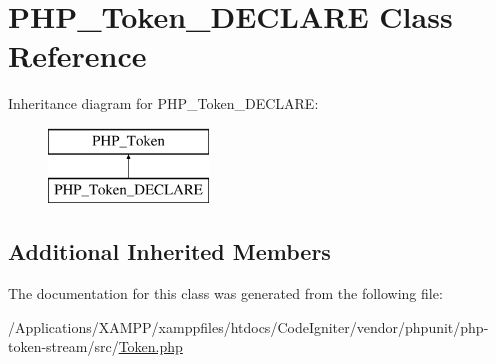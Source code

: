 \hypertarget{class_p_h_p___token___d_e_c_l_a_r_e}{}\section{P\+H\+P\+\_\+\+Token\+\_\+\+D\+E\+C\+L\+A\+RE Class Reference}
\label{class_p_h_p___token___d_e_c_l_a_r_e}
Inheritance diagram for P\+H\+P\+\_\+\+Token\+\_\+\+D\+E\+C\+L\+A\+RE\+:\begin{figure}[H]
\begin{center}
\leavevmode
\includegraphics[height=2.000000cm]{class_p_h_p___token___d_e_c_l_a_r_e}
\end{center}
\end{figure}
\subsection*{Additional Inherited Members}


The documentation for this class was generated from the following file\+:\begin{DoxyCompactItemize}
\item 
/\+Applications/\+X\+A\+M\+P\+P/xamppfiles/htdocs/\+Code\+Igniter/vendor/phpunit/php-\/token-\/stream/src/\mbox{\hyperlink{_token_8php}{Token.\+php}}\end{DoxyCompactItemize}
